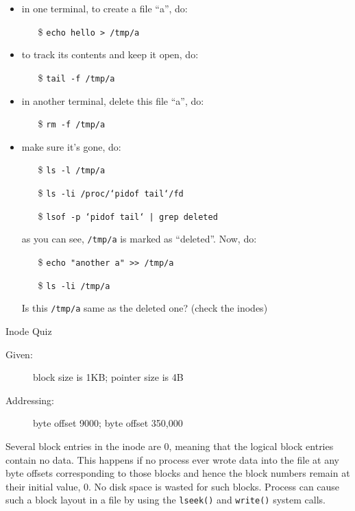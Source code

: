 \begin{itemize}
\item in one terminal, to create a file ``a'', do:
  \begin{itemize}
  \item[\$] \texttt{echo hello > /tmp/a} 
  \end{itemize}
\item to track its contents and keep it open, do:
  \begin{itemize}
  \item[\$] \texttt{tail -f /tmp/a}
  \end{itemize}
\item in another terminal, delete this file ``a'', do:
  \begin{itemize}
  \item[\$] \texttt{rm -f /tmp/a}
  \end{itemize}
\item make sure it's gone, do:
  \begin{itemize}
  \item[\$] \texttt{ls -l /tmp/a}
  \item[\$] \texttt{ls -li /proc/`pidof tail`/fd}
  \item[\$] \texttt{lsof -p `pidof tail` | grep deleted}
  \end{itemize}
  as you can see, \texttt{/tmp/a} is marked as ``deleted''. Now, do:
  \begin{itemize}
  \item[\$] \texttt{echo "another a" >> /tmp/a}
  \item[\$] \texttt{ls -li /tmp/a}
  \end{itemize}
  Is this \texttt{/tmp/a} same as the deleted one? (check the inodes)
\end{itemize}

\begin{frame}{Inode Quiz}
  \begin{description}
  \item[Given:] block size is 1KB; pointer size is 4B
  \item[Addressing:] byte offset 9000; byte offset 350,000
  \end{description}
  \centering
\end{frame}

Several block entries in the inode are 0, meaning that the logical block entries contain
no data. This happens if no process ever wrote data into the file at any byte offsets
corresponding to those blocks and hence the block numbers remain at their initial value,
0. No disk space is wasted for such blocks. Process can cause such a block layout in a
file by using the \verb|lseek()| and \verb|write()| system calls.

